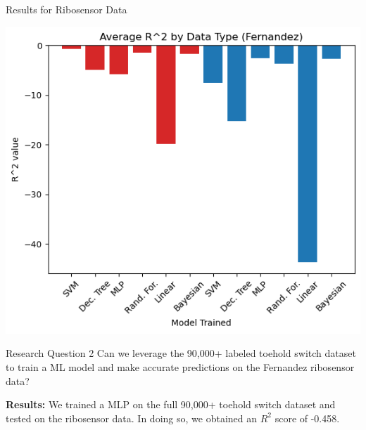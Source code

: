 \documentclass[9pt, dvipsnames]{beamer}
\begin{document}
\begin{frame}{Results for Ribosensor Data}
    \begin{center}
        \includegraphics[height=0.7\paperheight]{assets/Average-R^2-by-Data-Type-Fernandez.png}
    \end{center}
\end{frame}

\begin{frame}{Research Question 2}
    \Large
    Can we leverage the 90,000+ labeled toehold switch dataset to train a
    ML model and make accurate predictions on the Fernandez ribosensor data?
    \bigskip
    \pause

    \textbf{Results:} We trained a MLP on the full 90,000+ toehold switch
    dataset and tested on the ribosensor data. In doing so, we obtained an
    $R^2$ score of -0.458.

\end{frame}
\end{document}
